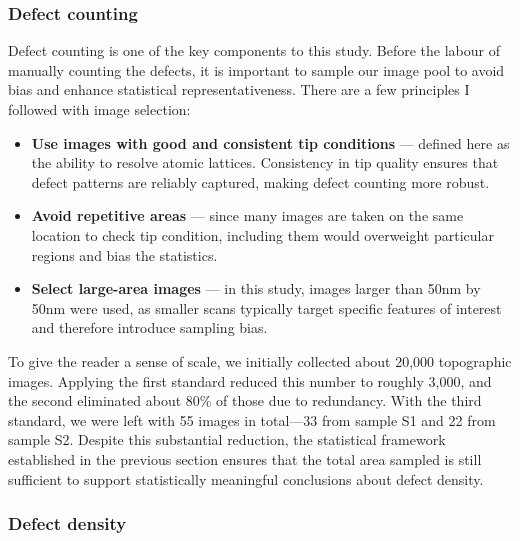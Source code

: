 \subsubsection{Defect counting}
Defect counting is one of the key components to this study. Before the labour of manually counting the defects, it is important to sample our image pool to avoid bias and enhance statistical representativeness. There are a few principles I followed with image selection: 
\begin{itemize}
	\item \textbf{Use images with good and consistent tip conditions} — defined here as the ability to resolve atomic lattices. Consistency in tip quality ensures that defect patterns are reliably captured, making defect counting more robust.	
	\item \textbf{Avoid repetitive areas} — since many images are taken on the same location to check tip condition, including them would overweight particular regions and bias the statistics.
	\item \textbf{Select large-area images} — in this study, images larger than 50nm by 50nm were used, as smaller scans typically target specific features of interest and therefore introduce sampling bias. 
\end{itemize}  
To give the reader a sense of scale, we initially collected about 20,000 topographic images. Applying the first standard reduced this number to roughly 3,000, and the second eliminated about 80\% of those due to redundancy. With the third standard, we were left with 55 images in total—33 from sample S1 and 22 from sample S2. Despite this substantial reduction, the statistical framework established in the previous section ensures that the total area sampled is still sufficient to support statistically meaningful conclusions about defect density.

\subsubsection{Defect density}

